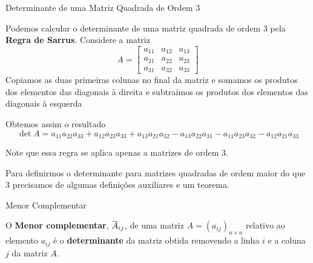\begin{teoria}{Determinante de uma Matriz Quadrada de Ordem 3}
    
    Podemos calcular o determinante de uma matriz quadrada de ordem 3 pela \textbf{Regra de Sarrus}.
    Considere a matriz
    \[ A = \left[\begin{array}{ccc}
        a_{11} & a_{12} & a_{13} \\ 
        a_{21} & a_{22} & a_{23} \\ 
        a_{31} & a_{32} & a_{33}
        \end{array}\right]
    \]
    Copiamos as duas primeiras colunas no final da matriz e 
    somamos os produtos dos elementos das diagonais à direita e subtraímos os produtos dos elementos das diagonais à esquerda


    Obtemos assim o resultado
    \[ \det A = a_{11} a_{22} a_{33} + a_{12} a_{23} a_{33} + a_{13} a_{21} a_{32} 
               -a_{13} a_{22} a_{31} - a_{11} a_{23} a_{32} - a_{12} a_{21} a_{33}
     \]
     
     \begin{observacao}
         Note que essa regra se aplica apenas a matrizes de ordem 3.
     \end{observacao}
    
\end{teoria}

\begin{observacao}
    Para definirmos o determinante para matrizes quadradas de ordem maior do que 3 precisamos de algumas definições auxiliares e um teorema.
\end{observacao}

\begin{teoria}{Menor Complementar}

    O \textbf{Menor complementar}, $\minor{A}_{ij}$, de uma matriz $A=(a_{ij})_{n\times n}$ relativo ao elemento $a_{ij}$ é o \textbf{determinante}
    da matriz obtida removendo a linha $i$ e a coluna $j$ da matriz $A$. 

\end{teoria}

